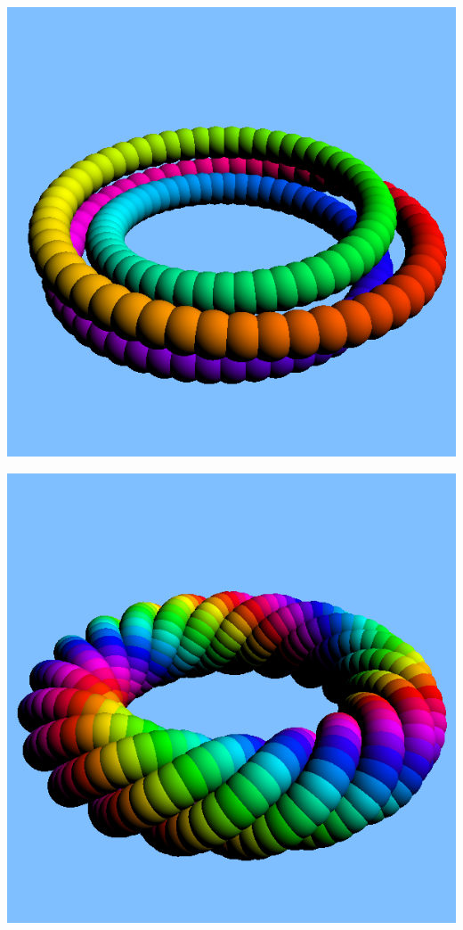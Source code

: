 \documentclass{article}
\begin{document}
\begin{description}
\begin{center}
      {\includegraphics[scale=0.5]{ring03.png}}

      {\includegraphics[scale=0.5]{ring02.png}}

\end{center}


\end{description}
\end{document}
